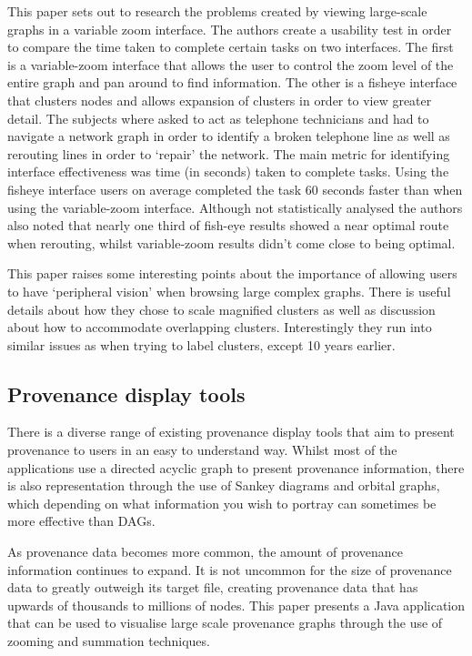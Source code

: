 This paper sets out to research the problems created by viewing large-scale graphs in a variable zoom interface. The authors create a usability test in order to compare the time taken to complete certain tasks on two interfaces. The first is a variable-zoom interface that allows the user to control the zoom level of the entire graph and pan around to find information. The other is a fisheye interface that clusters nodes and allows expansion of clusters in order to view greater detail. The subjects where asked to act as telephone technicians and had to navigate a network graph in order to identify a broken telephone line as well as rerouting lines in order to `repair' the network. The main metric for identifying interface effectiveness was time (in seconds) taken to complete tasks. Using the fisheye interface users on average completed the task 60 seconds faster than when using the variable-zoom interface. Although not statistically analysed the authors also noted that nearly one third of fish-eye results showed a near optimal route when rerouting, whilst variable-zoom results didn't come close to being optimal.

This paper raises some interesting points about the importance of allowing users to have `peripheral vision' when browsing large complex graphs. There is useful details about how they chose to scale magnified clusters as well as discussion about how to accommodate overlapping clusters. Interestingly they run into similar issues as \cite{Abello2006} when trying to label clusters, except 10 years earlier.  

\subsection{Provenance display tools}

There is a diverse range of existing provenance display tools that aim to present provenance to users in an easy to understand way. Whilst most of the applications use a directed acyclic graph to present provenance information, there is also representation through the use of Sankey diagrams and orbital graphs, which depending on what information you wish to portray can sometimes be more effective than DAGs.


As provenance data becomes more common, the amount of provenance information continues to expand. It is not uncommon for the size of provenance data to greatly outweigh its target file, creating provenance data that has upwards of thousands to millions of nodes. This paper presents a Java application that can be used to visualise large scale provenance graphs through the use of zooming and summation techniques.

